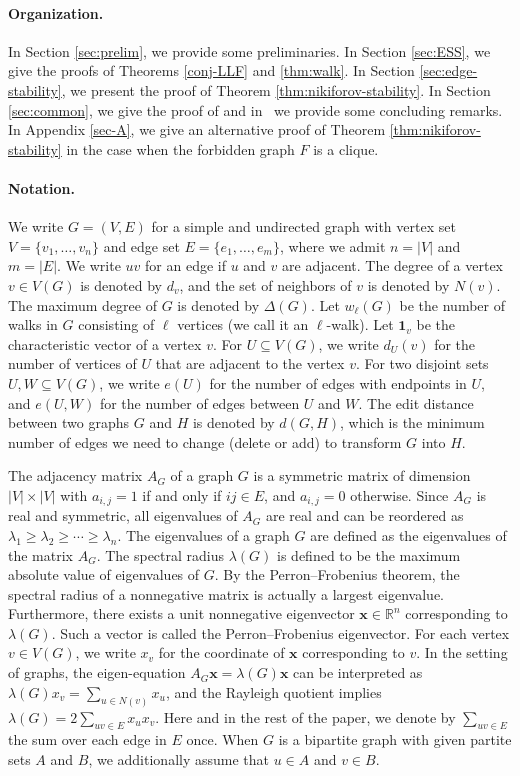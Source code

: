 \documentclass[11pt,a4paper]{article}
\theoremstyle{definition}
\theoremstyle{remark}
\begin{document}
\paragraph{Organization.}
In Section \ref{sec:prelim}, we provide some preliminaries. 
In Section \ref{sec:ESS}, 
we give the proofs of Theorems \ref{conj-LLF} and \ref{thm:walk}. In Section \ref{sec:edge-stability}, we present the proof of Theorem \ref{thm:nikiforov-stability}. 
In Section \ref{sec:common}, we give the proof of  and in~ we provide some concluding remarks. 
In Appendix \ref{sec-A}, we give an alternative proof of Theorem \ref{thm:nikiforov-stability} in the case when the forbidden graph $F$ is a clique. 


\paragraph{Notation.} 
We write $G=(V,E)$ for a simple and undirected graph with vertex set $V=\{v_1,\ldots ,v_n\}$ and edge set $E=\{e_1,\ldots ,e_m\}$, where we admit 
$n=|V|$ and $m=|E|$. 
We write $uv$ for an edge if $u$ and $v$ are adjacent.  
The degree of a vertex $v\in V(G)$ is denoted by 
$d_v$, and the set of neighbors of $v$ is denoted by $N(v)$. 
The maximum degree of $G$ is denoted by 
$\Delta (G)$. 
Let $w_{\ell} (G)$ be the number of walks in $G$ consisting of $\ell$ vertices (we call it an $\ell$-walk). 
Let $\bm{1}_v$ be the characteristic vector of a vertex $v$.  
For $U\subseteq V(G)$, 
we write $d_U(v)$ for the number of vertices of $U$ that are adjacent to the vertex $v$.  
For two disjoint sets $U,W\subseteq V(G)$, 
we write $e(U)$ for the number of edges with endpoints in $U$, and $e(U,W)$ for the number of edges between $U$ and $W$. 
The edit distance between two graphs $G$ and $H$ is denoted by $d(G,H)$, which is the minimum number of edges we need to change (delete or add) to transform $G$ into $H$.  

The adjacency matrix $A_G$ 
of a graph $G$ is a symmetric matrix of dimension $|V|\times |V|$ with $a_{i,j}=1$ if and only if $ij\in E$, and $a_{i,j}=0$ otherwise. 
Since $A_G$ is real and symmetric, 
all eigenvalues of $A_G$ are real and can be reordered as $\lambda_1\ge \lambda_2\ge \cdots \ge \lambda_n$.  The eigenvalues of a graph $G$ are defined as the eigenvalues of the matrix $A_G$. 
The spectral radius $\lambda (G)$ is defined to be the maximum absolute value of eigenvalues of $G$. By the Perron--Frobenius theorem, 
the spectral radius of a nonnegative matrix is actually a largest eigenvalue. Furthermore, there exists a unit nonnegative eigenvector $\bm{x}\in \mathbb{R}^n$  corresponding to $\lambda (G)$. 
Such a vector is called the Perron--Frobenius eigenvector. For each vertex $v\in V(G)$, 
we write $x_v$ for the coordinate of $\bm{x}$ corresponding to $v$. 
In the setting of graphs, 
the eigen-equation $A_G\bm{x}= \lambda (G) \bm{x}$ can be interpreted as $\lambda(G) x_v = \sum_{u\in N(v)} x_u$, and the Rayleigh quotient implies 
$\lambda (G) = 2 \sum_{uv\in E} x_ux_v$. 
Here and in the rest of the paper, we denote by $\sum_{uv \in E}$ the sum over each edge in $E$ once. When $G$ is a bipartite graph with given partite sets $A$ and $B$, we additionally assume that $u \in A$ and $v \in B$.
\end{document}
